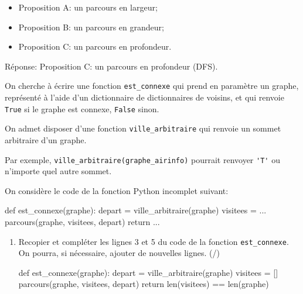\begin{enumerate}[resume=monDS]
\begin{minipage}{0.48\linewidth}
    \begin{itemize}[label=$\square$]
    \item Proposition A\@:  un parcours en largeur;
    \item Proposition B\@: un parcours en grandeur;
    \item Proposition C\@: un parcours en profondeur.
\end{itemize}
\end{minipage}\hfill{}
\begin{minipage}{0.48\linewidth}
    \begin{blocvisible}[height=1.5]
    Réponse: Proposition C\@: un parcours en profondeur (DFS).
    \end{blocvisible}
\end{minipage}



\end{enumerate}


\medskip

On cherche à écrire une fonction \texttt{est\_connexe} qui prend en paramètre un graphe, représenté à l'aide d'un dictionnaire de dictionnaires de voisins, et qui renvoie \texttt{True} si le graphe est connexe, \texttt{False} sinon.

On admet disposer d'une fonction \texttt{ville\_arbitraire} qui renvoie un sommet arbitraire d'un graphe.

Par exemple, \texttt{ville\_arbitraire(graphe\_airinfo)} pourrait renvoyer \verb|'T'| ou n'importe quel autre sommet.

On considère le code de la fonction Python incomplet suivant:

\begin{CodePythontexAlt}[TaillePolice=\large, Largeur=1\linewidth,Centre,Lignes=true,PremLigne=1]{}
def est_connexe(graphe):
    depart = ville_arbitraire(graphe)
    visitees = ...
    parcours(graphe, visitees, depart)  
    return ...
\end{CodePythontexAlt}

\begin{enumerate}[resume=monDS]
    \item Recopier et compléter les lignes 3 et 5 du code de la fonction \texttt{est\_connexe}. On pourra, si nécessaire, ajouter de nouvelles lignes. (/)

\begin{blocvisible}[height=3.5]
\begin{CodePythontexAlt}[TaillePolice=\large, Largeur=1\linewidth,Centre,Lignes=true,PremLigne=1]{}
def est_connexe(graphe):
    depart = ville_arbitraire(graphe)
    visitees = []
    parcours(graphe, visitees, depart)
    return len(visitees) == len(graphe)
\end{CodePythontexAlt}
\end{blocvisible}

\end{enumerate}
\pagebreak


